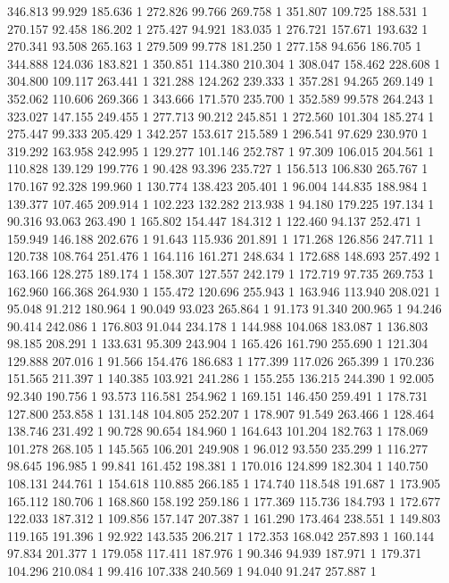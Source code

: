 	346.813	99.929	185.636	1
	272.826	99.766	269.758	1
	351.807	109.725	188.531	1
	270.157	92.458	186.202	1
	275.427	94.921	183.035	1
	276.721	157.671	193.632	1
	270.341	93.508	265.163	1
	279.509	99.778	181.250	1
	277.158	94.656	186.705	1
	344.888	124.036	183.821	1
	350.851	114.380	210.304	1
	308.047	158.462	228.608	1
	304.800	109.117	263.441	1
	321.288	124.262	239.333	1
	357.281	94.265	269.149	1
	352.062	110.606	269.366	1
	343.666	171.570	235.700	1
	352.589	99.578	264.243	1
	323.027	147.155	249.455	1
	277.713	90.212	245.851	1
	272.560	101.304	185.274	1
	275.447	99.333	205.429	1
	342.257	153.617	215.589	1
	296.541	97.629	230.970	1
	319.292	163.958	242.995	1
	129.277	101.146	252.787	1
	97.309	106.015	204.561	1
	110.828	139.129	199.776	1
	90.428	93.396	235.727	1
	156.513	106.830	265.767	1
	170.167	92.328	199.960	1
	130.774	138.423	205.401	1
	96.004	144.835	188.984	1
	139.377	107.465	209.914	1
	102.223	132.282	213.938	1
	94.180	179.225	197.134	1
	90.316	93.063	263.490	1
	165.802	154.447	184.312	1
	122.460	94.137	252.471	1
	159.949	146.188	202.676	1
	91.643	115.936	201.891	1
	171.268	126.856	247.711	1
	120.738	108.764	251.476	1
	164.116	161.271	248.634	1
	172.688	148.693	257.492	1
	163.166	128.275	189.174	1
	158.307	127.557	242.179	1
	172.719	97.735	269.753	1
	162.960	166.368	264.930	1
	155.472	120.696	255.943	1
	163.946	113.940	208.021	1
	95.048	91.212	180.964	1
	90.049	93.023	265.864	1
	91.173	91.340	200.965	1
	94.246	90.414	242.086	1
	176.803	91.044	234.178	1
	144.988	104.068	183.087	1
	136.803	98.185	208.291	1
	133.631	95.309	243.904	1
	165.426	161.790	255.690	1
	121.304	129.888	207.016	1
	91.566	154.476	186.683	1
	177.399	117.026	265.399	1
	170.236	151.565	211.397	1
	140.385	103.921	241.286	1
	155.255	136.215	244.390	1
	92.005	92.340	190.756	1
	93.573	116.581	254.962	1
	169.151	146.450	259.491	1
	178.731	127.800	253.858	1
	131.148	104.805	252.207	1
	178.907	91.549	263.466	1
	128.464	138.746	231.492	1
	90.728	90.654	184.960	1
	164.643	101.204	182.763	1
	178.069	101.278	268.105	1
	145.565	106.201	249.908	1
	96.012	93.550	235.299	1
	116.277	98.645	196.985	1
	99.841	161.452	198.381	1
	170.016	124.899	182.304	1
	140.750	108.131	244.761	1
	154.618	110.885	266.185	1
	174.740	118.548	191.687	1
	173.905	165.112	180.706	1
	168.860	158.192	259.186	1
	177.369	115.736	184.793	1
	172.677	122.033	187.312	1
	109.856	157.147	207.387	1
	161.290	173.464	238.551	1
	149.803	119.165	191.396	1
	92.922	143.535	206.217	1
	172.353	168.042	257.893	1
	160.144	97.834	201.377	1
	179.058	117.411	187.976	1
	90.346	94.939	187.971	1
	179.371	104.296	210.084	1
	99.416	107.338	240.569	1
	94.040	91.247	257.887	1
